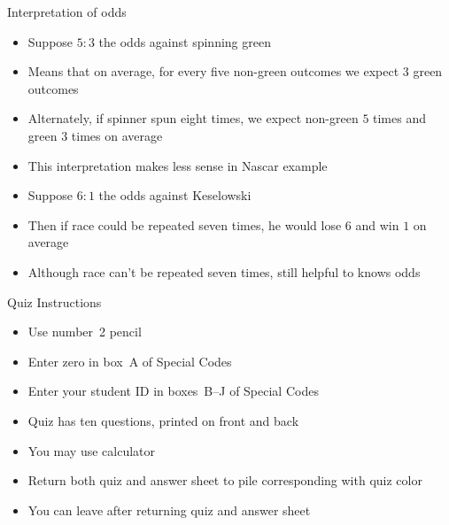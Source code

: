 \documentclass[handout]{beamer}
\theoremstyle{definition}
\begin{document}
\begin{frame}{Interpretation of odds} 
\begin{itemize}
\item Suppose $5:3$ the odds against spinning green
\item Means that on average, for every five non-green outcomes
we expect $3$ green outcomes
\item Alternately, if spinner spun eight times, we expect
non-green $5$ times and green $3$ times on average
\item This interpretation makes less sense in Nascar example
\item Suppose $6:1$ the odds against Keselowski
\item Then if race could be repeated seven times, he would
lose $6$ and win $1$ on average
\item Although race can't be repeated seven times,
still helpful to knows odds
\end{itemize}
\end{frame}

\begin{frame}{Quiz Instructions}
\begin{itemize}
\item Use number~2 pencil
\item Enter zero in box~A of Special Codes
\item Enter your student ID in boxes~B--J of Special Codes
\item Quiz has ten questions, printed on front and back
\item You \alert{may} use calculator
\item Return both quiz and answer sheet to pile
corresponding with quiz color
\item You can leave after returning quiz and answer sheet
\end{itemize}
\end{frame}
\end{document}
